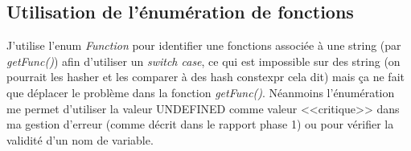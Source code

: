 \documentclass[]{article}
\begin{document}
\subsection{Utilisation de l'énumération de fonctions}
J'utilise l'enum \textit{Function} pour identifier une fonctions associée à une string (par \textit{getFunc()}) afin d'utiliser un \textit{switch case}, ce qui est impossible sur des string (on pourrait les hasher et les comparer à des hash constexpr cela dit) mais ça ne fait que déplacer le problème dans la fonction \textit{getFunc()}. Néanmoins l'énumération me permet d'utiliser la valeur UNDEFINED comme valeur <<critique>> dans ma gestion d'erreur (comme décrit dans le rapport phase 1) ou pour vérifier la validité d'un nom de variable.
\end{document}
